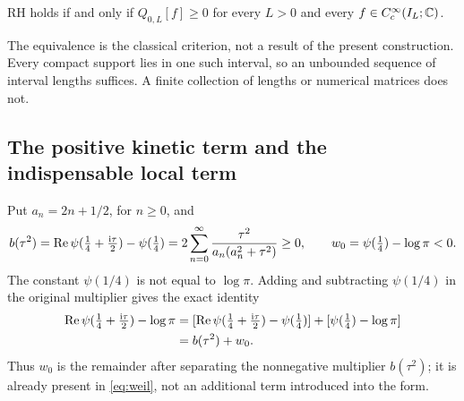 \begin{theorem}\label{thm:weil}
RH holds if and only if $Q_{0,L}[f]\geq0$ for every $L>0$ and every
$f\in C_c^\infty(I_L;\mathbb C)$.
\end{theorem}
The equivalence is the classical criterion, not a result of the present
construction. Every compact support lies in one such interval, so an
unbounded sequence of interval lengths suffices. A finite collection of
lengths or numerical matrices does not.

\subsection{The positive kinetic term and the indispensable local term}

Put $a_n=2n+1/2$, for $n\geq0$, and
\begin{equation}\label{eq:b-symbol}
 b(\tau^2)=\operatorname{Re}\psi(\tfrac14+\tfrac{\mathrm i\tau}2)-\psi(\tfrac14)
 =2\sum_{n=0}^\infty\frac{\tau^2}{a_n(a_n^2+\tau^2)}\geq0,
 \qquad w_0=\psi(\tfrac14)-\log\pi<0.
\end{equation}
The constant $\psi(1/4)$ is not equal to $\log\pi$. Adding and
subtracting $\psi(1/4)$ in the original multiplier gives the exact identity
\begin{align}\label{eq:archimedean-split}
 \operatorname{Re}\psi(\tfrac14+\tfrac{\mathrm i\tau}2)-\log\pi
 &=[\operatorname{Re}\psi(\tfrac14+\tfrac{\mathrm i\tau}2)-\psi(\tfrac14)]
   +[\psi(\tfrac14)-\log\pi]\notag\\
 &=b(\tau^2)+w_0.
\end{align}
Thus $w_0$ is the remainder after separating the nonnegative multiplier
$b(\tau^2)$; it is already present in \eqref{eq:weil}, not an additional
term introduced into the form.

